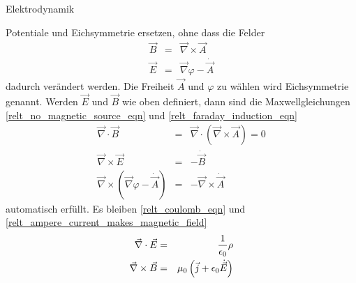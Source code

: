 \begin{chapter}{\titlestr}
\begin{section}{Elektrodynamik}
\begin{subsection}{Potentiale und Eichsymmetrie}
ersetzen, ohne dass die Felder
\begin{eqnarray*}
\vec{B} &=& \vec{\nabla}\times \vec{A}\\
\vec{E} &=& \vec{\nabla}\varphi-\dot{\vec{A}}
\end{eqnarray*}
dadurch verändert werden. Die Freiheit $\vec{A}$ und $\varphi$ zu wählen wird Eichsymmetrie genannt.
Werden $\vec{E}$ und $\vec{B}$ wie oben definiert, dann sind die Maxwellgleichungen
\ref{relt_no_magnetic_source_eqn} und \ref{relt_faraday_induction_eqn}
\begin{eqnarray*}
\vec{\nabla}\cdot\vec{B} &=& \vec{\nabla}\cdot\left(\vec{\nabla}\times \vec{A}\right)=0\\
\vec{\nabla}\times\vec{E} &=& -\dot{\vec{B}}\\
\vec{\nabla}\times\left(\vec{\nabla}\varphi-\dot{\vec{A}}\right) &=& -\vec{\nabla}\times \dot{\vec{A}}
\end{eqnarray*}
 automatisch erfüllt. Es bleiben \ref{relt_coulomb_eqn} und \ref{relt_ampere_current_makes_magnetic_field}
\begin{eqnarray*}
\vec{\nabla}\cdot\vec{E} &=& \frac{1}{\epsilon_0}\rho\cr
\vec{\nabla}\times\vec{B} &=& \mu_0\left(\vec{j}+\epsilon_0\dot{\vec{E}}\right)
\end{eqnarray*}
\end{subsection}


\end{section}
\end{chapter}
